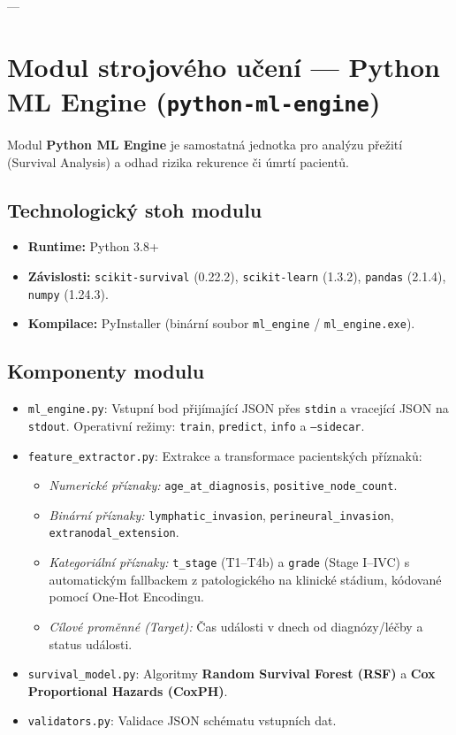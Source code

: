 \documentclass[12pt,a4paper]{article}
\begin{document}
---

\section{Modul strojového učení --- Python ML Engine (\texttt{python-ml-engine})}

Modul \textbf{Python ML Engine} je samostatná jednotka pro analýzu přežití (Survival Analysis) a odhad rizika rekurence či úmrtí pacientů.

\subsection{Technologický stoh modulu}
\begin{itemize}
    \item \textbf{Runtime:} Python 3.8+
    \item \textbf{Závislosti:} \texttt{scikit-survival} (0.22.2), \texttt{scikit-learn} (1.3.2), \texttt{pandas} (2.1.4), \texttt{numpy} (1.24.3).
    \item \textbf{Kompilace:} PyInstaller (binární soubor \texttt{ml\_engine} / \texttt{ml\_engine.exe}).
\end{itemize}

\subsection{Komponenty modulu}
\begin{itemize}
    \item \texttt{ml\_engine.py}: Vstupní bod přijímající JSON přes \texttt{stdin} a vracející JSON na \texttt{stdout}. Operativní režimy: \texttt{train}, \texttt{predict}, \texttt{info} a \texttt{--sidecar}.
    \item \texttt{feature\_extractor.py}: Extrakce a transformace pacientských příznaků:
    \begin{itemize}
        \item \textit{Numerické příznaky:} \texttt{age\_at\_diagnosis}, \texttt{positive\_node\_count}.
        \item \textit{Binární příznaky:} \texttt{lymphatic\_invasion}, \texttt{perineural\_invasion}, \texttt{extranodal\_extension}.
        \item \textit{Kategoriální příznaky:} \texttt{t\_stage} (T1--T4b) a \texttt{grade} (Stage I--IVC) s automatickým fallbackem z patologického na klinické stádium, kódované pomocí One-Hot Encodingu.
        \item \textit{Cílové proměnné (Target):} Čas události v dnech od diagnózy/léčby a status události.
    \end{itemize}
    \item \texttt{survival\_model.py}: Algoritmy \textbf{Random Survival Forest (RSF)} a \textbf{Cox Proportional Hazards (CoxPH)}.
    \item \texttt{validators.py}: Validace JSON schématu vstupních dat.
\end{itemize}
\end{document}
